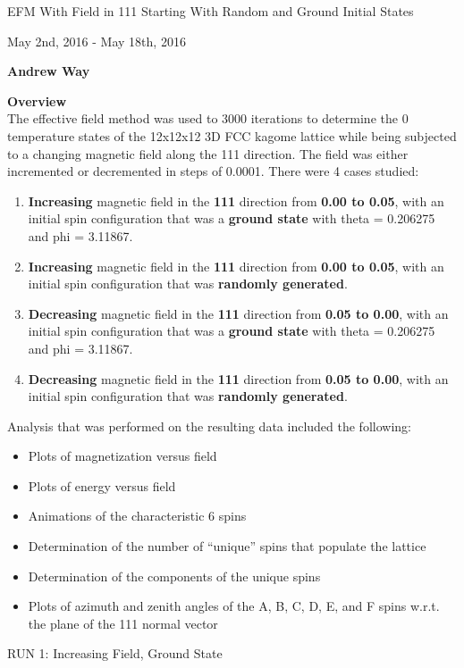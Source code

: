 \documentclass{article}
\begin{document}
\thispagestyle{plain}
\begin{center}
    \Large
    EFM With Field in 111 Starting With Random and Ground Initial States
    
    \vspace{0.4cm}
    \large
    May 2nd, 2016 - May 18th, 2016
    
    \vspace{0.4cm}
    \textbf{Andrew Way}
    
    \vspace{0.9cm}
    \textbf{Overview} \\
    \vspace{5mm}
    The effective field method was used to 3000 iterations to determine the 0 temperature states of 
    the 12x12x12 3D FCC kagome lattice while being subjected to a changing magnetic field along the 111 
    direction. The field was either incremented or decremented in steps of 0.0001. 
    There were 4 cases studied:
    \begin{enumerate}
     \item \textbf{Increasing} magnetic field in the \textbf{111} direction from \textbf{0.00 to 0.05},
     with an initial 
     spin configuration that was a \textbf{ground state} with theta = 0.206275 and phi = 3.11867.
     \item \textbf{Increasing} magnetic field in the \textbf{111} direction from \textbf{0.00 to 0.05},
     with an initial 
     spin configuration that was \textbf{randomly generated}.
     \item \textbf{Decreasing} magnetic field in the \textbf{111} direction from \textbf{0.05 to 0.00},
     with an initial
     spin configuration that was a \textbf{ground state} with theta = 0.206275 and phi = 3.11867.
     \item \textbf{Decreasing} magnetic field in the \textbf{111} direction from \textbf{0.05 to 0.00},
     with an initial
     spin configuration that was \textbf{randomly generated}.
    \end{enumerate}
    Analysis that was performed on the resulting data included the following:
    \begin{itemize}
     \item Plots of magnetization versus field
     \item Plots of energy versus field
     \item Animations of the characteristic 6 spins 
     \item Determination of the number of ``unique'' spins that populate the lattice
     \item Determination of the components of the unique spins
     \item Plots of azimuth and zenith angles of the A, B, C, D, E, and F spins w.r.t. the plane of the 111 normal vector 
    \end{itemize}

\end{center}
\pagebreak
\thispagestyle{plain}
\begin{center}
\LARGE
RUN 1: Increasing Field, Ground State
\end{center}
\end{document}
